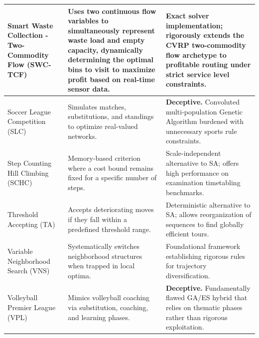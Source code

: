 \begin{center}
\begin{longtable}{
  >{\raggedright\arraybackslash}p{}
  >{\raggedright\arraybackslash}p{}
  >{\raggedright\arraybackslash}p{}
}
Smart Waste Collection - Two-Commodity Flow (SWC-TCF) & Uses two continuous flow variables to simultaneously represent waste load and empty capacity, dynamically determining the optimal bins to visit to maximize profit based on real-time sensor data. & Exact solver implementation; rigorously extends the CVRP two-commodity flow archetype to profitable routing under strict service level constraints. \\ \midrule

Soccer League Competition (SLC) & Simulates matches, substitutions, and standings to optimize real-valued networks. & \textbf{Deceptive.} Convoluted multi-population Genetic Algorithm burdened with unnecessary sports rule constraints. \\ \midrule

Step Counting Hill Climbing (SCHC) & Memory-based criterion where a cost bound remains fixed for a specific number of steps. & Scale-independent alternative to SA; offers high performance on examination timetabling benchmarks. \\ \midrule

Threshold Accepting (TA) & Accepts deteriorating moves if they fall within a predefined threshold range. & Deterministic alternative to SA; allows reorganization of sequences to find globally efficient tours. \\ \midrule

Variable Neighborhood Search (VNS) & Systematically switches neighborhood structures when trapped in local optima. & Foundational framework establishing rigorous rules for trajectory diversification. \\ \midrule

Volleyball Premier League (VPL) & Mimics volleyball coaching via substitution, coaching, and learning phases. & \textbf{Deceptive.} Fundamentally flawed GA/ES hybrid that relies on thematic phases rather than rigorous exploitation. \\ \bottomrule
\end{longtable}
\end{center}
